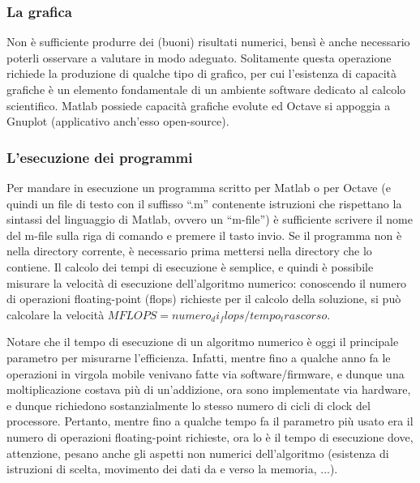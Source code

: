 
\subsubsection{La grafica}

Non è sufficiente produrre dei (buoni) risultati numerici, bensì è anche necessario poterli osservare a valutare in modo adeguato. Solitamente questa operazione richiede la produzione di qualche tipo di grafico, per cui l’esistenza di capacità grafiche è un elemento fondamentale di un ambiente software dedicato al calcolo scientifico. Matlab possiede capacità grafiche evolute ed Octave si appoggia a Gnuplot (applicativo anch’esso open-source).



\subsubsection{L’esecuzione dei programmi}

Per mandare in esecuzione un programma scritto per Matlab o per Octave (e quindi un file di testo con il suffisso ``.m'' contenente istruzioni che rispettano la sintassi del linguaggio di Matlab, ovvero un ``m-file'') è sufficiente scrivere il nome del m-file sulla riga di comando e premere il tasto invio. Se il programma non è nella directory corrente, è necessario prima mettersi nella directory che lo contiene.
Il calcolo dei tempi di esecuzione è semplice, e quindi è possibile misurare la velocità di esecuzione dell’algoritmo numerico: conoscendo il numero di operazioni floating-point (flops) richieste per il calcolo della soluzione, si può calcolare la velocità $MFLOPS = numero_di_flops / tempo_trascorso$.

Notare che il tempo di esecuzione di un algoritmo numerico è oggi il principale parametro per misurarne l'efficienza. Infatti, mentre fino a qualche anno fa le operazioni in virgola mobile venivano fatte via software/firmware, e dunque una moltiplicazione costava più di un'addizione, ora sono implementate via hardware, e dunque richiedono sostanzialmente lo stesso numero di cicli di clock del processore. Pertanto, mentre fino a qualche tempo fa il parametro più usato era il numero di operazioni floating-point richieste, ora lo è il tempo di esecuzione dove, attenzione, pesano anche gli aspetti non numerici dell'algoritmo (esistenza di istruzioni di scelta, movimento dei dati da e verso la memoria, ...).

